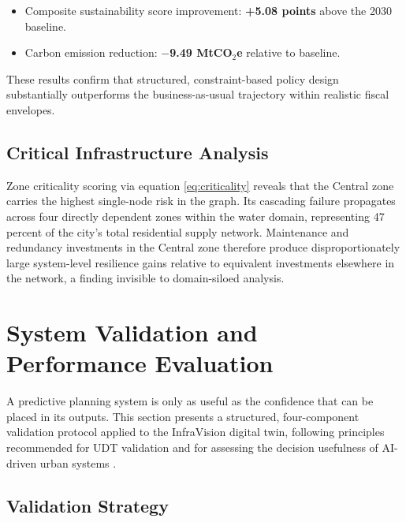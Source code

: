 \documentclass[conference]{IEEEtran}
\begin{document}
\begin{itemize}
\item Composite sustainability score improvement: \textbf{+5.08 points}
above the 2030 baseline.
\item Carbon emission reduction: \textbf{$-$9.49 MtCO$_2$e} relative
to baseline.
\end{itemize}

These results confirm that structured, constraint-based policy design
substantially outperforms the business-as-usual trajectory within
realistic fiscal envelopes.

\subsection{Critical Infrastructure Analysis}

Zone criticality scoring via equation \eqref{eq:criticality} reveals
that the Central zone carries the highest single-node risk in the graph.
Its cascading failure propagates across four directly dependent zones
within the water domain, representing 47 percent of the city's total
residential supply network. Maintenance and redundancy investments in
the Central zone therefore produce disproportionately large system-level
resilience gains relative to equivalent investments elsewhere in the
network, a finding invisible to domain-siloed analysis.

\section{System Validation and Performance Evaluation}
\label{sec:validation}

A predictive planning system is only as useful as the confidence that
can be placed in its outputs. This section presents a structured,
four-component validation protocol applied to the InfraVision digital
twin, following principles recommended for UDT validation
\cite{alexandrov2024} and for assessing the decision usefulness of
AI-driven urban systems \cite{mazzetto2024}.

\subsection{Validation Strategy}
\end{document}
